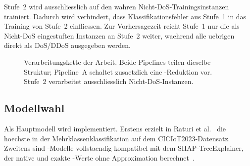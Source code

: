 Stufe~2 wird ausschliesslich auf den wahren Nicht-DoS-Trainingsinstanzen trainiert.
Dadurch wird verhindert, dass Klassifikationsfehler aus Stufe~1 in das Training von Stufe~2
einfliessen.
Zur Vorhersagezeit reicht Stufe~1 nur die als Nicht-DoS eingestuften Instanzen an Stufe~2
weiter, waehrend alle uebrigen direkt als DoS/DDoS ausgegeben werden.

\begin{figure}[h]
\centering
{}
\caption{Verarbeitungskette der Arbeit. Beide Pipelines teilen dieselbe Struktur; Pipeline~A
schaltet zusaetzlich eine \pca{}-Reduktion vor. Stufe~2 verarbeitet ausschliesslich
Nicht-DoS-Instanzen.}
\label{fig:architektur}
\end{figure}

\subsection{Modellwahl}

Als Hauptmodell wird \gb{} implementiert.
Erstens erzielt \gb{} in Raturi et al.\ \cite{raturi2026exploratory} die hoechste \ba{} in
der Mehrklassenklassifikation auf dem CICIoT2023-Datensatz.
Zweitens sind \gb{}-Modelle vollstaendig kompatibel mit dem SHAP-TreeExplainer, der native
und exakte \shap{}-Werte ohne Approximation berechnet~\cite{mohale2025xai,hermosilla2025xai_forensic}.


